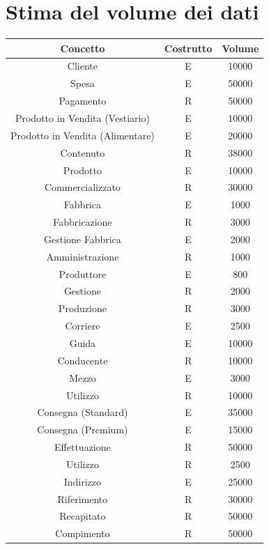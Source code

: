 \documentclass[a4paper,12pt]{report}
\begin{document}
\section{Stima del volume dei dati}
\begin{center}
    \begin{tabular}{ | c  c  c|} 
    \hline
    Concetto&Costrutto&Volume \\
    \hline
	\hline
    Cliente&E&10000 \\
	Spesa&E&50000 \\
	Pagamento&R&50000 \\
	\hline
	Prodotto in Vendita (Vestiario) &E&10000 \\
	Prodotto in Vendita (Alimentare) &E&20000 \\
	Contenuto&R&38000 \\
	Prodotto&E&10000 \\
	Commercializzato&R&30000 \\
	\hline
	Fabbrica&E&1000 \\
	Fabbricazione&R&3000 \\
	Gestione Fabbrica&E&2000 \\
	Amministrazione&R&1000 \\
	Produttore&E&800\\
	Gestione&R&2000 \\
	Produzione&R&3000\\
	\hline
	Corriere&E&2500\\
	Guida&E&10000\\
	Conducente&R&10000\\
	Mezzo&E&3000\\
	Utilizzo&R&10000\\
	Consegna (Standard) &E&35000\\
	Consegna (Premium) &E&15000\\
	Effettuazione&R&50000\\
	Utilizzo&R&2500\\
	Indirizzo&E&25000\\
	Riferimento&R&30000\\
	Recapitato&R&50000\\
	Compimento&R&50000\\
    \hline
    \end{tabular}
\end{center}
\end{document}
